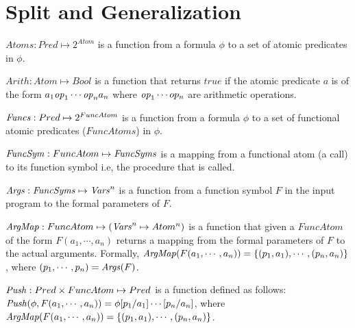 \section{Split and Generalization}


\begin{definition}
 $Atoms: Pred \mapsto 2^{Atom}$  is a function from a formula $\phi$ to 
 a set of atomic predicates in $\phi$. 
\end{definition}

\begin{definition}
$Arith: Atom \mapsto Bool$  is a function that returns $true$ if the atomic predicate $a$ 
is of the form $a_1 \mathit{op}_1 \cdots \mathit{op}_n a_n$ where $\mathit{op}_1 \cdots op_n$ are arithmetic 
operations.
\end{definition}

\begin{definition}
 $\mathit{Funcs}: Pred \mapsto 2^{FuncAtom}$  is a function from a formula $\phi$ to 
 a set of functional atomic predicates ($FuncAtoms$) in $\phi$. 
\end{definition}

\begin{definition}
$\mathit{FuncSym}: FuncAtom \mapsto \mathit{FuncSyms}$  is a mapping from a functional atom (a call) to 
its function symbol i.e, the procedure that is called.
\end{definition}

\begin{definition}
$\mathit{Args}: \mathit{FuncSyms} \mapsto \mathit{Vars}^n$ is a function from a function symbol $F$ 
in the input program to the formal parameters of $F$.
\end{definition}

\begin{definition}
$\mathit{ArgMap}: FuncAtom \mapsto (\mathit{Vars}^n \mapsto Atom^n)$  is a function that given a 
$FuncAtom$ of the form $F(a_1,\cdots,a_n)$ returns a mapping from the 
formal parameters of $F$ to the actual arguments.
Formally, $\mathit{ArgMap}(F(a_1,\cdots,a_n)) = \{ (p_1,a_1),\cdots,(p_n,a_n) \}$,
where $(p_1,\cdots,p_n) = \mathit{Args}(F)$.
\end{definition}

\begin{definition}
$\mathit{Push_{}}: Pred \times FuncAtom \mapsto Pred$  is a function defined as follows:
$\mathit{Push_{}}(\phi,F(a_1,\cdots,a_n)) = \phi[p_1/a_1]\cdots [p_n/a_n]$,
where $\mathit{ArgMap}(F(a_1,\cdots,a_n)) = \{ (p_1,a_1),\cdots,(p_n,a_n) \}$.
\end{definition}

